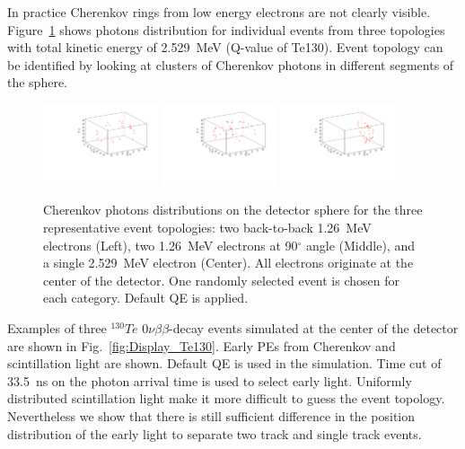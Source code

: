 \documentclass[12pt,twoside,letterpaper]{article}
\newcommand{\vbb}{0\nu\beta\beta}
\newcommand{\Te}{^{130}Te}
\begin{document}
In practice Cherenkov rings from low energy electrons are not clearly visible. Figure~\ref{fig:Display_top_2p5MeV} shows photons distribution for individual events from three topologies with total kinetic energy of 2.529~MeV (Q-value of Te130). Event topology can be identified by looking at clusters of Cherenkov photons in different segments of the sphere.


\begin{figure}[htb]
\centering
\includegraphics[angle=0,width=0.3\textwidth]{plots/hDisplay_topology180_2p529MeVTot}
\includegraphics[angle=0,width=0.3\textwidth]{plots/hDisplay_topology90_2p529MeVTot}
\includegraphics[angle=0,width=0.3\textwidth]{plots/hDisplay_1el_2p529MeV}
\caption{Cherenkov photons distributions on the detector sphere for the three representative event topologies: two back-to-back 1.26~MeV electrons (Left), two 1.26~MeV electrons at 90$^{\circ}$ angle (Middle), and a single 2.529~MeV electron (Center).  All electrons originate at the center of the detector. One randomly selected event is chosen for each category. Default QE is applied.}
\label{fig:Display_top_2p5MeV}
\end{figure}

Examples of three $\Te$ $\vbb$-decay events simulated at the center of the detector are shown in Fig.~\ref{fig:Display_Te130}. Early PEs from Cherenkov and scintillation light are shown. Default QE is used in the simulation. Time cut of 33.5~ns on the photon arrival time is used to select early light. Uniformly distributed scintillation light make it more difficult to guess the event topology.
Nevertheless we show that there is still sufficient difference in the position distribution of the early light to separate two track and single track events.
\end{document}
